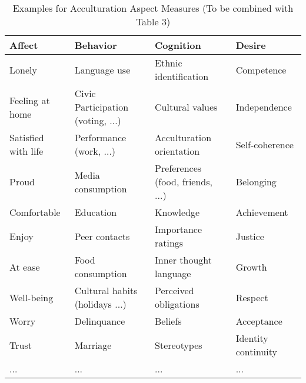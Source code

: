 \begin{table}[hbt!]
\caption{Examples for Acculturation Aspect Measures (To be combined with Table 3)}
\label{tab:ExamplesTab} 
\begin{tabular}{@{}llll@{}}
\toprule
Affect              & Behavior                                     & Cognition                          & Desire                \\ \midrule
Lonely              & Language   use                               & Ethnic   identification            & Competence            \\
Feeling at home     & Civic   Participation (voting, ...)          & Cultural   values                  & Independence          \\
Satisfied with life & Performance   (work, ...)                    & Acculturation   orientation        & Self-coherence        \\
Proud               & Media   consumption                          & Preferences   (food, friends, ...) & Belonging             \\
Comfortable         & Education                                    & Knowledge                          & Achievement           \\
Enjoy               & Peer   contacts                              & Importance   ratings               & Justice               \\
At ease             & Food   consumption                           & Inner   thought language           & Growth                \\
Well-being          & Cultural   habits (holidays ...) & Perceived   obligations            & Respect               \\
Worry               & Delinquance                                  & Beliefs                            & Acceptance            \\
Trust               & Marriage                                     & Stereotypes                        & Identity   continuity \\
...                 & ...                                          & ...                                & ...                   \\ \bottomrule
\end{tabular}
\end{table}